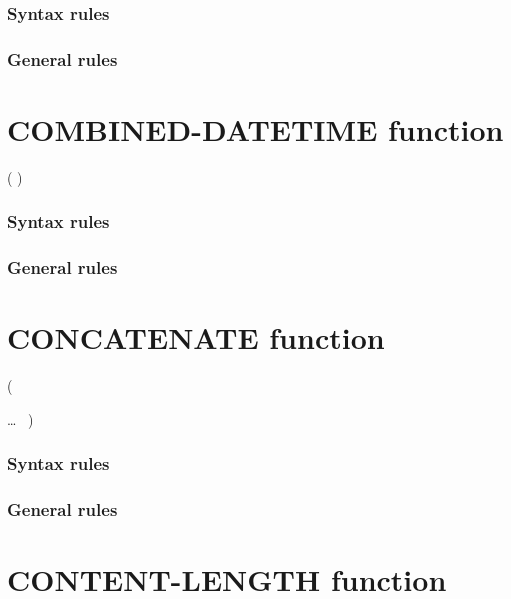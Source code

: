 \subsubsection{Syntax rules}

\subsubsection{General rules}

\section{COMBINED-DATETIME function}

\begin{syntax}
    ( \argument \argument )
\end{syntax}

\subsubsection{Syntax rules}

\subsubsection{General rules}

\section{CONCATENATE function}

\begin{syntax}
    (
  \begin{1=}
    \argument
  \end{1=}
  \ldots
  \ {})
\end{syntax}

\subsubsection{Syntax rules}

\subsubsection{General rules}

\section{CONTENT-LENGTH function}

